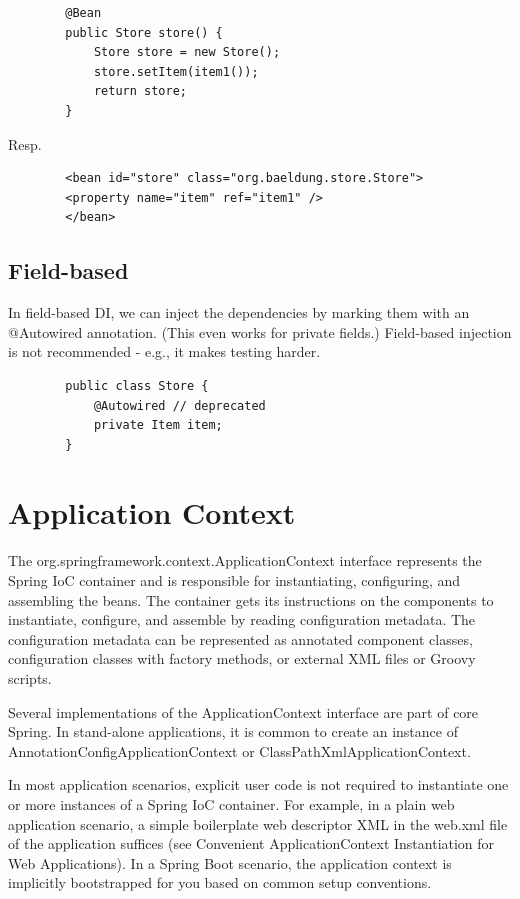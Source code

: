 \documentclass{scrartcl}
\begin{document}
    \begin{lstlisting}
        @Bean
        public Store store() {
            Store store = new Store();
            store.setItem(item1());
            return store;
        }
    \end{lstlisting}

    Resp.

    \begin{lstlisting}
        <bean id="store" class="org.baeldung.store.Store">
        <property name="item" ref="item1" />
        </bean>
    \end{lstlisting}

\subsection{Field-based}

    In field-based DI, we can inject the dependencies by marking them with an @Autowired annotation. (This even works for private fields.)
    Field-based injection is not recommended - e.g., it makes testing harder.

    \begin{lstlisting}
        public class Store {
            @Autowired // deprecated
            private Item item;
        }
    \end{lstlisting}

\section{Application Context}

The org.springframework.context.ApplicationContext interface represents the Spring IoC container and is responsible for instantiating, configuring, and assembling the beans. The container gets its instructions on the components to instantiate, configure, and assemble by reading configuration metadata. The configuration metadata can be represented as annotated component classes, configuration classes with factory methods, or external XML files or Groovy scripts.

Several implementations of the ApplicationContext interface are part of core Spring. In stand-alone applications, it is common to create an instance of AnnotationConfigApplicationContext or ClassPathXmlApplicationContext.

In most application scenarios, explicit user code is not required to instantiate one or more instances of a Spring IoC container. For example, in a plain web application scenario, a simple boilerplate web descriptor XML in the web.xml file of the application suffices (see Convenient ApplicationContext Instantiation for Web Applications). In a Spring Boot scenario, the application context is implicitly bootstrapped for you based on common setup conventions.
\end{document}
